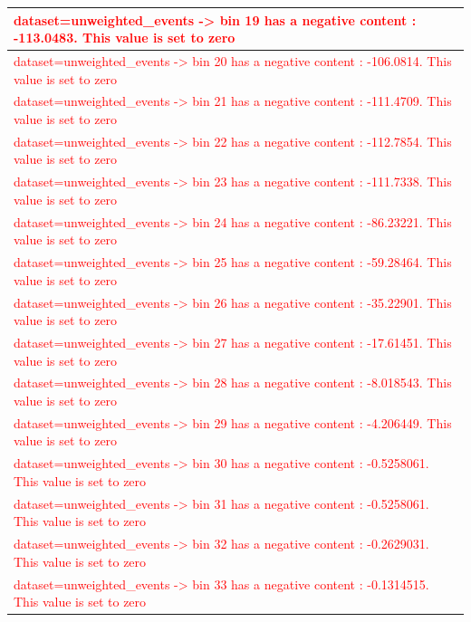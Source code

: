 \documentclass[a4paper, 10pt]{article}
\begin{document}
\begin{table}[H]
\begin{center}
\begin{tabular}{|m{140.0mm}|}
      \hline
      {\cellcolor{white}\textcolor{red}{dataset=unweighted\_events -> bin 19 has a negative content : -113.0483. This value is set to zero}}\\
      \hline
      {\cellcolor{white}\textcolor{red}{dataset=unweighted\_events -> bin 20 has a negative content : -106.0814. This value is set to zero}}\\
      \hline
      {\cellcolor{white}\textcolor{red}{dataset=unweighted\_events -> bin 21 has a negative content : -111.4709. This value is set to zero}}\\
      \hline
      {\cellcolor{white}\textcolor{red}{dataset=unweighted\_events -> bin 22 has a negative content : -112.7854. This value is set to zero}}\\
      \hline
      {\cellcolor{white}\textcolor{red}{dataset=unweighted\_events -> bin 23 has a negative content : -111.7338. This value is set to zero}}\\
      \hline
      {\cellcolor{white}\textcolor{red}{dataset=unweighted\_events -> bin 24 has a negative content : -86.23221. This value is set to zero}}\\
      \hline
      {\cellcolor{white}\textcolor{red}{dataset=unweighted\_events -> bin 25 has a negative content : -59.28464. This value is set to zero}}\\
      \hline
      {\cellcolor{white}\textcolor{red}{dataset=unweighted\_events -> bin 26 has a negative content : -35.22901. This value is set to zero}}\\
      \hline
      {\cellcolor{white}\textcolor{red}{dataset=unweighted\_events -> bin 27 has a negative content : -17.61451. This value is set to zero}}\\
      \hline
      {\cellcolor{white}\textcolor{red}{dataset=unweighted\_events -> bin 28 has a negative content : -8.018543. This value is set to zero}}\\
      \hline
      {\cellcolor{white}\textcolor{red}{dataset=unweighted\_events -> bin 29 has a negative content : -4.206449. This value is set to zero}}\\
      \hline
      {\cellcolor{white}\textcolor{red}{dataset=unweighted\_events -> bin 30 has a negative content : -0.5258061. This value is set to zero}}\\
      \hline
      {\cellcolor{white}\textcolor{red}{dataset=unweighted\_events -> bin 31 has a negative content : -0.5258061. This value is set to zero}}\\
      \hline
      {\cellcolor{white}\textcolor{red}{dataset=unweighted\_events -> bin 32 has a negative content : -0.2629031. This value is set to zero}}\\
      \hline
      {\cellcolor{white}\textcolor{red}{dataset=unweighted\_events -> bin 33 has a negative content : -0.1314515. This value is set to zero}}\\
      \hline
\hline
    \end{tabular}
  \end{center}
\end{table}
\end{document}

